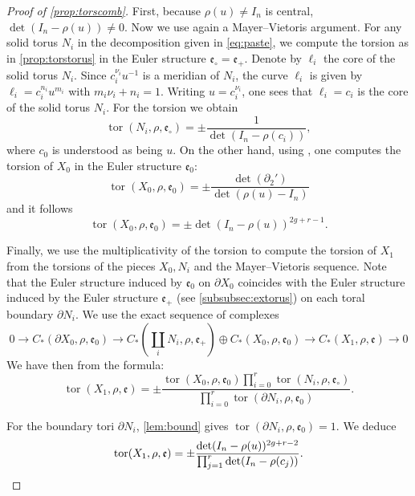 \documentclass[10pt]{amsart}
\theoremstyle{plain}
\theoremstyle{definition}
\theoremstyle{remark}
\numberwithin{equation}{section}
\DeclareMathOperator{\tor}{tor}
\begin{document}
\begin{proof}[Proof of \cref{prop:torscomb}]
First, because $\rho(u) \neq I_n$ is central, $\det(I_n - \rho(u)) \neq 0$.
Now we use again a Mayer--Vietoris argument.
For any solid torus $N_i$ in the decomposition given in \cref{eq:paste}, we compute the torsion as in \cref{prop:torstorus} in the Euler structure $\mathfrak e_\circ = \mathfrak e_+$. Denote by $\ell_i$ the core of the solid torus $N_i$. Since $c_i^{\nu_i} u^{-1}$ is a meridian of $N_i$, the curve $\ell_i$ is given by $\ell_i= c_i^{n_i} u^{m_i}$ with $m_i\nu_i + n_i = 1$. Writing $u=c_i^{\nu_i}$, one sees that $\ell_i = c_i$ is the core of the solid torus $N_i$. For the torsion we obtain
\[
\tor(N_i, \rho, \mathfrak e_\circ) = \pm \frac 1 {\det(I_n - \rho(c_i))},
\]
where $c_0$ is understood as being $u$.
On the other hand, using \cite[Th.\,2.2]{Turaev_book}, one computes the torsion of $X_0$ in the Euler structure $\mathfrak e_0$:
\begin{equation}
\label{eq:torX0}
\tor(X_0, \rho, \mathfrak e_0) = \pm \frac{\det(\partial_2')}{\det(\rho(u)-I_n)}
\end{equation}
and it follows
\begin{equation}
\label{eq:tor0}
\tor(X_0, \rho, \mathfrak e_0) = \pm \det(I_n-\rho(u))^{2g+r-1}.
\end{equation}

Finally, we use the multiplicativity of the torsion to compute the torsion of $X_1$ from the torsions of the pieces $X_0, N_i$ and the Mayer--Vietoris sequence.
Note that the Euler structure induced by $\mathfrak e_0$ on $\partial X_0$ coincides with the Euler structure induced by the Euler structure $\mathfrak e_+$ (see \cref{subsubsec:extorus}) on each toral boundary $\partial N_i$.
We use the exact sequence of complexes
\[
0 \to C_*(\partial X_0, \rho, \mathfrak e_0) \to C_*({\textstyle\coprod_i N_i}, \rho, \mathfrak e_+) \oplus C_*(X_0, \rho, \mathfrak e_0) \to C_*(X_1, \rho, \mathfrak e) \to 0
\]
We have then from \cite[Th.\,1.5]{Turaev_book} the formula:
\[
\tor(X_1, \rho, \mathfrak e) =\pm \frac{\tor(X_0, \rho, \mathfrak e_0) \prod_{i=0}^r\tor(N_i, \rho, \mathfrak e_\circ)}{\prod_{i=0}^r\tor(\partial N_i,\rho, \mathfrak e_0)}.
\]

For the boundary tori $\partial N_i$, \cref{lem:bound} gives $\tor(\partial N_i, \rho, \mathfrak e_0) = 1$. We deduce
\begin{equation*}
\tor(X_1, \rho, \mathfrak e) = \pm \frac{\det(I_n-\rho(u))^{2g+r-2}}{\prod_{j=1}^r \det(I_n-\rho(c_j))}.\qedhere
\end{equation*}
\end{proof}
\end{document}
